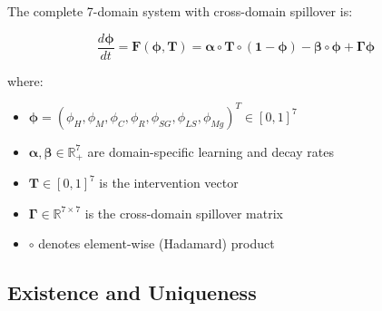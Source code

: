 The complete 7-domain system with cross-domain spillover is:

\begin{equation}
\frac{d\boldsymbol{\phi}}{dt} = \mathbf{F}(\boldsymbol{\phi}, \mathbf{T}) = \boldsymbol{\alpha} \circ \mathbf{T} \circ (\mathbf{1} - \boldsymbol{\phi}) - \boldsymbol{\beta} \circ \boldsymbol{\phi} + \boldsymbol{\Gamma} \boldsymbol{\phi}
\label{eq:ooo-coupled}
\end{equation}

where:
\begin{itemize}[nosep]
\item $\boldsymbol{\phi} = (\phi_H, \phi_M, \phi_C, \phi_R, \phi_{SG}, \phi_{LS}, \phi_{Mg})^T \in [0,1]^7$
\item $\boldsymbol{\alpha}, \boldsymbol{\beta} \in \mathbb{R}^7_+$ are domain-specific learning and decay rates
\item $\mathbf{T} \in [0,1]^7$ is the intervention vector
\item $\boldsymbol{\Gamma} \in \mathbb{R}^{7 \times 7}$ is the cross-domain spillover matrix
\item $\circ$ denotes element-wise (Hadamard) product
\end{itemize}

\subsection{Existence and Uniqueness}

